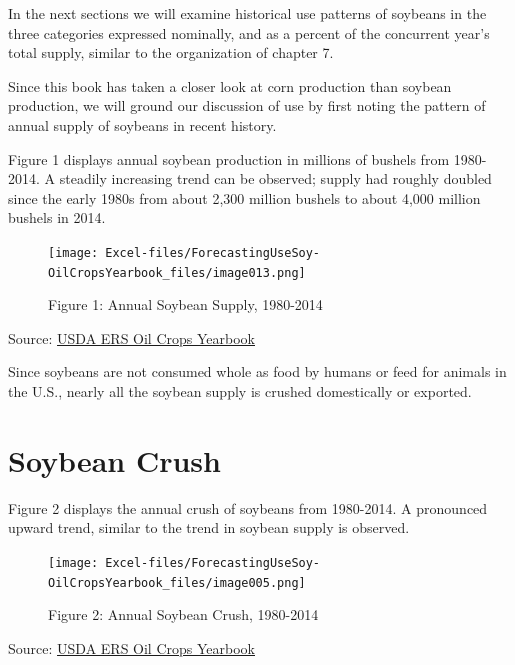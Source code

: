 \documentclass[
  letterpaper,
  DIV=11,
  numbers=noendperiod]{scrreprt}
\begin{document}
In the next sections we will examine historical use patterns of soybeans
in the three categories expressed nominally, and as a percent of the
concurrent year's total supply, similar to the organization of chapter
7.

Since this book has taken a closer look at corn production than soybean
production, we will ground our discussion of use by first noting the
pattern of annual supply of soybeans in recent history.

Figure 1 displays annual soybean production in millions of bushels from
1980-2014. A steadily increasing trend can be observed; supply had
roughly doubled since the early 1980s from about 2,300 million bushels
to about 4,000 million bushels in 2014.

\begin{figure}

{\centering \texttt{[image: Excel-files/ForecastingUseSoy-OilCropsYearbook\_files/image013.png]}

}

\caption{Figure 1: Annual Soybean Supply, 1980-2014}

\end{figure}

Source:
\href{http://www.ers.usda.gov/data-products/oil-crops-yearbook.aspx}{USDA
ERS Oil Crops Yearbook}

Since soybeans are not consumed whole as food by humans or feed for
animals in the U.S., nearly all the soybean supply is crushed
domestically or exported.

\hypertarget{soybean-crush}{%
\section{Soybean Crush}\label{soybean-crush}}

Figure 2 displays the annual crush of soybeans from 1980-2014. A
pronounced upward trend, similar to the trend in soybean supply is
observed.

\begin{figure}

{\centering \texttt{[image: Excel-files/ForecastingUseSoy-OilCropsYearbook\_files/image005.png]}

}

\caption{Figure 2: Annual Soybean Crush, 1980-2014}

\end{figure}

Source:
\href{http://www.ers.usda.gov/data-products/oil-crops-yearbook.aspx}{USDA
ERS Oil Crops Yearbook}
\end{document}
